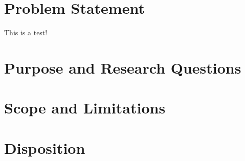 

\section{Problem Statement}

This is a test! \cite{DECAS}


\section{Purpose and Research Questions}

\section{Scope and Limitations}

\section{Disposition}